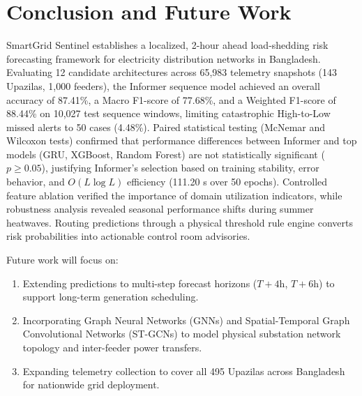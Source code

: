 \section{Conclusion and Future Work}
SmartGrid Sentinel establishes a localized, 2-hour ahead load-shedding risk forecasting framework for electricity distribution networks in Bangladesh. Evaluating 12 candidate architectures across 65,983 telemetry snapshots (143 Upazilas, 1,000 feeders), the Informer sequence model achieved an overall accuracy of 87.41\%, a Macro F1-score of 77.68\%, and a Weighted F1-score of 88.44\% on 10,027 test sequence windows, limiting catastrophic High-to-Low missed alerts to 50 cases (4.48\%). Paired statistical testing (McNemar and Wilcoxon tests) confirmed that performance differences between Informer and top models (GRU, XGBoost, Random Forest) are not statistically significant ($p \ge 0.05$), justifying Informer's selection based on training stability, error behavior, and $O(L \log L)$ efficiency (111.20 s over 50 epochs). Controlled feature ablation verified the importance of domain utilization indicators, while robustness analysis revealed seasonal performance shifts during summer heatwaves. Routing predictions through a physical threshold rule engine converts risk probabilities into actionable control room advisories.

Future work will focus on:
\begin{enumerate}
    \item Extending predictions to multi-step forecast horizons ($T+4\text{h}$, $T+6\text{h}$) to support long-term generation scheduling.
    \item Incorporating Graph Neural Networks (GNNs) and Spatial-Temporal Graph Convolutional Networks (ST-GCNs) to model physical substation network topology and inter-feeder power transfers.
    \item Expanding telemetry collection to cover all 495 Upazilas across Bangladesh for nationwide grid deployment.
\end{enumerate}
